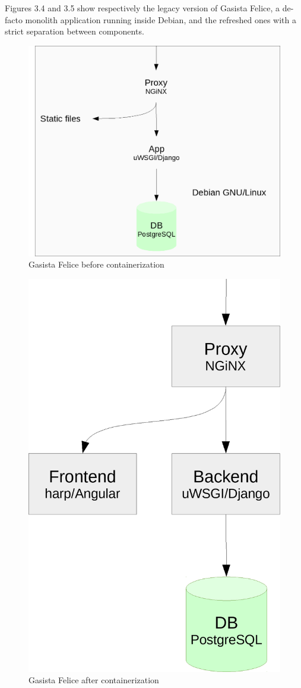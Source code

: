 Figures 3.4 and 3.5 show respectively the legacy version of Gasista Felice, a de-facto monolith application running inside Debian, and the refreshed ones with a strict separation between components.

\begin{figure}[htbp]
\centering
\includegraphics{media/ch3-gf_old.png}
\caption{Gasista Felice before containerization}
\end{figure}

\begin{figure}[htbp]
\centering
\includegraphics{media/ch3-gf.png}
\caption{Gasista Felice after containerization}
\end{figure}